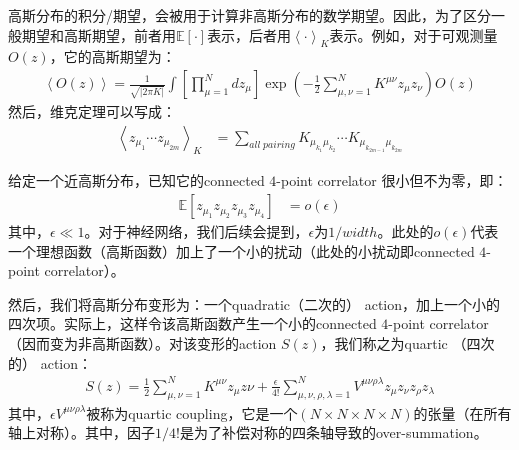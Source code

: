 高斯分布的积分/期望，会被用于计算非高斯分布的数学期望。因此，为了区分一般期望和高斯期望，前者用$\mathbb{E}[\cdot]$表示，后者用$\left<\cdot\right>_K$表示。例如，对于可观测量$O(z)$，它的高斯期望为：
\begin{equation}
    \begin{split}
        \left< O(z) \right> = \frac{1}{ \sqrt{|2\pi K|}}
        \int \left[\prod_{\mu=1}^N dz_\mu\right]
        \exp \left(
            -\frac{1}{2} \sum_{\mu,\nu=1}^{N}K^{\mu\nu}z_\mu z_\nu
            \right) 
        O(z)
    \end{split}
\end{equation}
然后，维克定理可以写成：
\begin{equation}
    \begin{split}
    \left< z_{\mu_1}\cdots z_{\mu_{2m}} \right>_K
        &= \sum_{all\;pairing} {
            K_{\mu_{k_1}\mu_{k_2}}
            \cdots
            K_{\mu_{k_{2m-1}}\mu_{k_{2m}}}
        }
    \end{split}
\end{equation}

给定一个近高斯分布，已知它的connected $4$-point correlator 很小但不为零，即：
\begin{equation}
    \begin{split}
    \mathbb{E}[z_{\mu_1}z_{\mu_2}z_{\mu_3}z_{\mu_4}]
        &= o(\epsilon)
    \end{split}
\end{equation}
其中，$\epsilon \ll 1$。对于神经网络，我们后续会提到，$\epsilon$为$1/width$。此处的$o(\epsilon)$代表一个理想函数（高斯函数）加上了一个小的扰动（此处的小扰动即connected $4$-point  correlator）。%

然后，我们将高斯分布变形为：一个quadratic（二次的） action，加上一个小的四次项。实际上，这样令该高斯函数产生一个小的connected $4$-point correlator（因而变为非高斯函数）。对该变形的action $S(z)$，我们称之为quartic （四次的） action：
\begin{equation}
    \begin{split}
        S(z) = \frac{1}{2} \sum_{\mu,\nu=1}^N K^{\mu\nu}z_\mu z\nu +
        \frac{\epsilon}{4!}\sum_{\mu,\nu,\rho,\lambda=1}^N
        V^{\mu\nu\rho\lambda}z_{\mu}z_{\nu}z_{\rho}z_{\lambda}
    \end{split}
\end{equation}
其中，$\epsilon V^{\mu\nu\rho\lambda}$被称为quartic coupling，它是一个$(N\times N\times N\times N)$的张量（在所有轴上对称）。其中，因子${1}/{4!}$是为了补偿对称的四条轴导致的over-summation。

